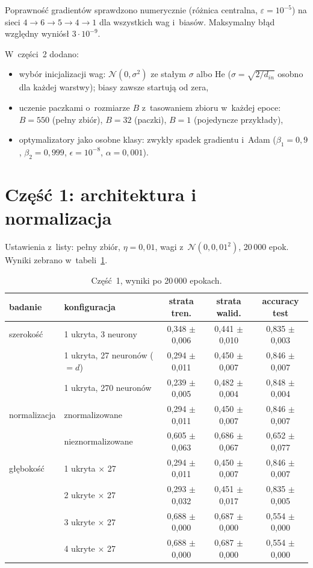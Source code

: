 \documentclass[11pt,a4paper]{article}
\begin{document}
Poprawność gradientów sprawdzono numerycznie (różnica centralna, $\varepsilon = 10^{-5}$) na sieci
$4 \to 6 \to 5 \to 4 \to 1$ dla wszystkich wag i~biasów. Maksymalny błąd względny wyniósł
$3\cdot10^{-9}$.

W~części~2 dodano:
\begin{itemize}
  \item wybór inicjalizacji wag: $\mathcal{N}(0, \sigma^2)$ ze stałym $\sigma$ albo He
    ($\sigma = \sqrt{2/d_{in}}$ osobno dla każdej warstwy); biasy zawsze startują od zera,
  \item uczenie paczkami o~rozmiarze $B$ z~tasowaniem zbioru w~każdej epoce: $B = 550$ (pełny zbiór),
    $B = 32$ (paczki), $B = 1$ (pojedyncze przykłady),
  \item optymalizatory jako osobne klasy: zwykły spadek gradientu i~Adam
    ($\beta_1 = 0{,}9$, $\beta_2 = 0{,}999$, $\epsilon = 10^{-8}$, $\alpha = 0{,}001$).
\end{itemize}

\section{Część 1: architektura i normalizacja}
Ustawienia z~listy: pełny zbiór, $\eta = 0{,}01$, wagi z~$\mathcal{N}(0, 0{,}01^2)$, 20\,000 epok.
Wyniki zebrano w~tabeli~\ref{tab:p1}.

\begin{table}[H]
\centering
\begin{tabular}{llccc}
\toprule
badanie & konfiguracja & strata tren. & strata walid. & accuracy test \\
\midrule
szerokość & 1 ukryta, 3 neurony & 0,348 $\pm$ 0,006 & 0,441 $\pm$ 0,010 & 0,835 $\pm$ 0,003 \\
          & 1 ukryta, 27 neuronów ($= d$) & 0,294 $\pm$ 0,011 & 0,450 $\pm$ 0,007 & 0,846 $\pm$ 0,007 \\
          & 1 ukryta, 270 neuronów & 0,239 $\pm$ 0,005 & 0,482 $\pm$ 0,004 & 0,848 $\pm$ 0,004 \\
\midrule
normalizacja & znormalizowane & 0,294 $\pm$ 0,011 & 0,450 $\pm$ 0,007 & 0,846 $\pm$ 0,007 \\
             & nieznormalizowane & 0,605 $\pm$ 0,063 & 0,686 $\pm$ 0,067 & 0,652 $\pm$ 0,077 \\
\midrule
głębokość & 1 ukryta $\times$ 27 & 0,294 $\pm$ 0,011 & 0,450 $\pm$ 0,007 & 0,846 $\pm$ 0,007 \\
          & 2 ukryte $\times$ 27 & 0,293 $\pm$ 0,032 & 0,451 $\pm$ 0,017 & 0,835 $\pm$ 0,005 \\
          & 3 ukryte $\times$ 27 & 0,688 $\pm$ 0,000 & 0,687 $\pm$ 0,000 & 0,554 $\pm$ 0,000 \\
          & 4 ukryte $\times$ 27 & 0,688 $\pm$ 0,000 & 0,687 $\pm$ 0,000 & 0,554 $\pm$ 0,000 \\
\bottomrule
\end{tabular}
\caption{Część~1, wyniki po 20\,000 epokach.}
\label{tab:p1}
\end{table}
\end{document}

